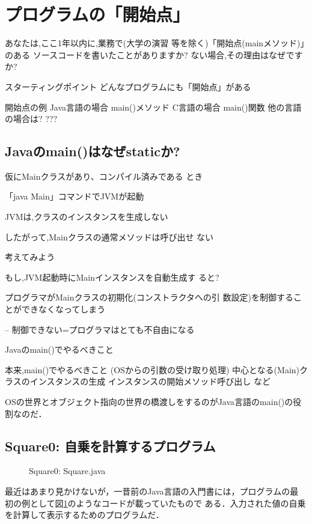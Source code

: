 \documentclass[a4j, twoside]{jsbook}
\begin{document}
\section{プログラムの「開始点」}
あなたは,ここ1年以内に,業務で(大学の演習
等を除く)「開始点(mainメソッド)」のある
ソースコードを書いたことがありますか?
ない場合,その理由はなぜですか?

スターティングポイント
 どんなプログラムにも「開始点」がある

開始点の例
 Java言語の場合
 main()メソッド
 C言語の場合
 main()関数
 他の言語の場合は?
 ???

\subsection{Javaのmain()はなぜstaticか?}
仮にMainクラスがあり、コンパイル済みである
とき

 「java Main」コマンドでJVMが起動

 JVMは,クラスのインスタンスを生成しない

 したがって,Mainクラスの通常メソッドは呼び出せ
ない

考えてみよう

 もし,JVM起動時にMainインスタンスを自動生成す
ると?

 プログラマがMainクラスの初期化(コンストラクタへの引
数設定)を制御することができなくなってしまう

– 制御できない=プログラマはとても不自由になる

Javaのmain()でやるべきこと

本来,main()でやるべきこと
 (OSからの引数の受け取り処理)
 中心となる(Main)クラスのインスタンスの生成
 インスタンスの開始メソッド呼び出し
 など

OSの世界とオブジェクト指向の世界の橋渡しをするのがJava言語のmain()の役
割なのだ．

\subsection{Square0: 自乗を計算するプログラム}
\begin{figure}
 
 \caption{Square0: Square.java}\label{fig:Square0:Square}
\end{figure}

最近はあまり見かけないが，一昔前のJava言語の入門書には，プログラムの最
初の例として図\ref{fig:Square0:Square}のようなコードが載っていたもので
ある．入力された値の自乗を計算して表示するためのプログラムだ．
\end{document}

